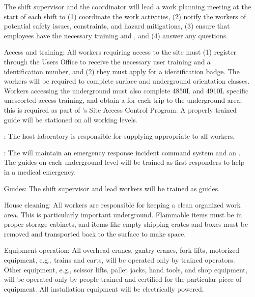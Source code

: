 The shift supervisor and the  coordinator  will lead a work planning meeting at the start of each shift  to (1) coordinate the work activities, (2) notify the workers of potential safety issues, constraints, and hazard mitigations, (3) ensure that employees have the necessary  training and , and (4) answer any questions.

{Access and training:}  All  workers requiring access to the  site must (1) register through the  Users Office to receive the necessary user training and a  identification number, and (2) they must apply for a  identification badge. 
The workers will be required to complete  surface and underground orientation classes. Workers accessing the underground must also complete 4850L and 4910L specific unescorted access training, and obtain a  for each trip to the underground area; this is required as part of 's Site Access Control Program. 
A properly trained guide will be stationed on all working levels. 

{:} 
The host laboratory is responsible for supplying appropriate  to all workers. 

{:} The  will maintain an emergency response incident command system and an .  The guides on each underground level will be trained as first responders to help in a medical emergency.
  
  Guides: The shift supervisor and lead workers will be trained as guides.
  
  {House cleaning:} All workers are responsible for keeping a clean organized work area. This is particularly important underground. Flammable items must be in proper storage cabinets, and items like empty shipping crates and boxes must be removed and 
transported back to the surface to make space.


{Equipment operation:} All overhead cranes, gantry cranes, fork lifts, motorized equipment, e.g., trains and carts, will be operated only by trained  operators. 
Other equipment, e.g., scissor lifts, pallet jacks, hand tools, and shop equipment, will be operated only by people trained
and certified for the particular piece of equipment. All installation equipment will be electrically powered.
